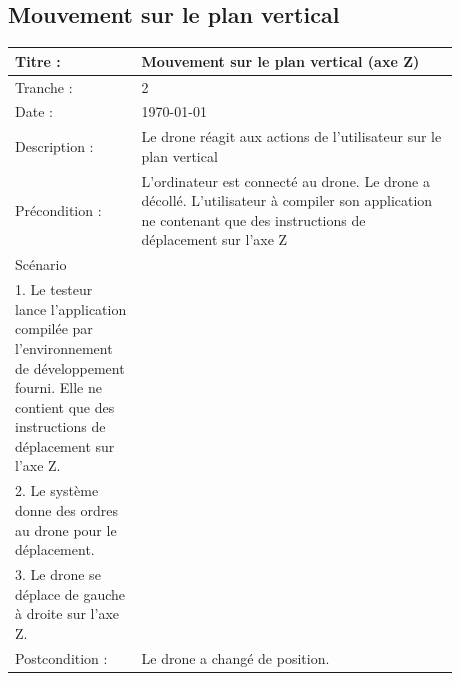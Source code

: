 \documentclass[12pt, openany]{report}
\begin{document}
\subsection*{Mouvement sur le plan vertical}
\begin{tabular}{|p{0.25\linewidth} | p{0.21\linewidth} | p{0.21\linewidth} | p{0.21\linewidth} |} 
\hline
\rowcolor[RGB]{200, 200, 200}Titre :& \multicolumn{3}{p{0.70\linewidth}|}{Mouvement sur le plan vertical (axe Z)} \\
\hline
Tranche :& \multicolumn{3}{p{0.70\linewidth}|}{2} \\
\hline
Date :& \multicolumn{3}{p{0.70\linewidth}|}{\today }\\
\hline
Description :& \multicolumn{3}{p{0.70\linewidth}|}{Le drone réagit aux actions de l'utilisateur sur le plan vertical} \\
\hline
Précondition :& \multicolumn{3}{p{0.70\linewidth}|}{L'ordinateur est connecté au drone. Le drone a décollé. L'utilisateur à compiler son application ne contenant que des instructions de déplacement sur l'axe Z} \\
\hline
Scénario & {
	\begin{minipage}[t]{\linewidth}
	Utilisateur : \\
	1. Le testeur lance l'application compilée par l'environnement de développement fourni. Elle ne contient que des instructions de déplacement sur l'axe Z.
	 \end{minipage}
	} & {
	\begin{minipage}[t]{\linewidth}
	Application :\\
	2. Le système donne des ordres au drone pour le déplacement.
	 \end{minipage}
	} & {
	\begin{minipage}[t]{\linewidth}
	Drone :\\
	3. Le drone se déplace de gauche à droite sur l'axe Z.
	 \end{minipage}
	} \\

\hline
Postcondition : & \multicolumn{3}{p{0.70\linewidth}|}{Le drone a changé de position.}\\
\hline
\end{tabular}
\end{document}

